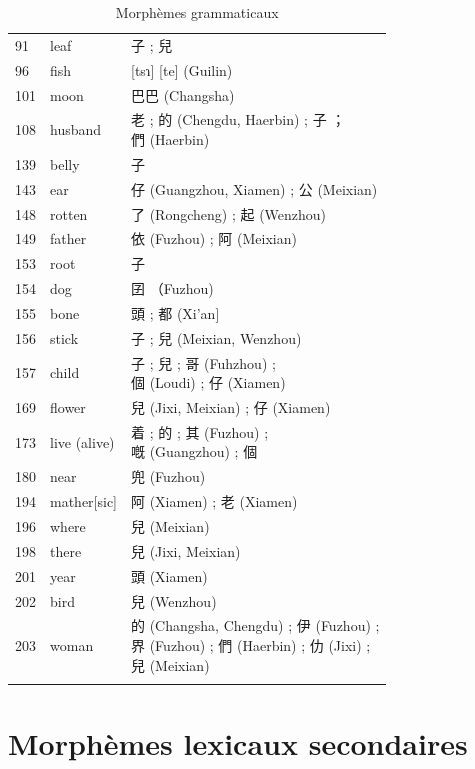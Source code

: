 \documentclass{scrbook}
\newcounter{c}[subsubsection]
\begin{document}
\begin{sloppypar}
\begin{appendices}
\begin{longtable}[htbp]{lll}
    91    & leaf  & 子 ; 兒 \\
    96    & fish  & [tsɿ] [te] (Guilin) \\
    101   & moon  & 巴巴 (Changsha) \\
    108   & husband & \makecell[l]{老 ; 的 (Chengdu, Haerbin) ; 子 ； \\們 (Haerbin)} \\
    139   & belly & 子 \\
    143   & ear   & 仔 (Guangzhou, Xiamen) ; 公 (Meixian) \\
    148   & rotten & 了 (Rongcheng) ; 起 (Wenzhou) \\
    149   & father & 依 (Fuzhou) ; 阿 (Meixian) \\
    153   & root  & 子 \\
    154   & dog   & 囝 （Fuzhou) \\
    155   & bone  & 頭 ; 都 (Xi'an] \\
    156   & stick & 子 ; 兒 (Meixian, Wenzhou) \\
    157   & child & \makecell[l]{子 ; 兒 ; 哥 (Fuhzhou) ; \\個 (Loudi) ; 仔 (Xiamen)} \\
    169   & flower & 兒 (Jixi, Meixian) ; 仔 (Xiamen) \\
    173   & live (alive) & \makecell[l]{着 ; 的 ; 其 (Fuzhou) ; \\嘅 (Guangzhou) ; 個} \\
    180   & near  & 兜 (Fuzhou) \\
    194   & mather[sic] & 阿 (Xiamen) ; 老 (Xiamen) \\    
    196   & where & 兒 (Meixian) \\
    198   & there & 兒 (Jixi, Meixian) \\
    201   & year  & 頭 (Xiamen) \\
    202   & bird  & 兒 (Wenzhou) \\
    203   & woman & \makecell[l]{的 (Changsha, Chengdu) ; 伊 (Fuzhou) ; \\界 (Fuzhou) ; 們 (Haerbin) ; 仂 (Jixi) ; \\兒 (Meixian)} \\
    \bottomrule
  \caption{Morphèmes grammaticaux}
  \label{tab:addlabel}%
\end{longtable}%

\chapter{Morphèmes lexicaux secondaires}\label{appendice2}


\end{appendices}
\end{sloppypar}
\end{document}
